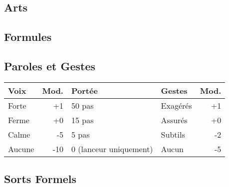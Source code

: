 \subsection*{Arts}

\magusArtsLong

\subsection*{Formules}
\begin{multicols}{2}
\castingformulas

\begin{small}
\end{small}

\end{multicols}
\subsection*{Paroles et Gestes}
\begin{tabularx}{\textwidth}{|X|r|l||X|r|}
\hline
Voix   & Mod. & Portée                          & Gestes   & Mod. \\ \hline
Forte  &  +1  & 50 pas                          & Exagérés & +1 \\
Ferme  &  +0  & 15 pas                          & Assurés  & +0 \\
Calme  &  -5  & 5 pas                           & Subtils  & -2 \\
Aucune & -10  & 0 {\small (lanceur uniquement)} & Aucun    & -5 \\ \hline
\end{tabularx}
\subsection*{Sorts Formels}
\begin{multicols}{2}
\longspells
\end{multicols}
